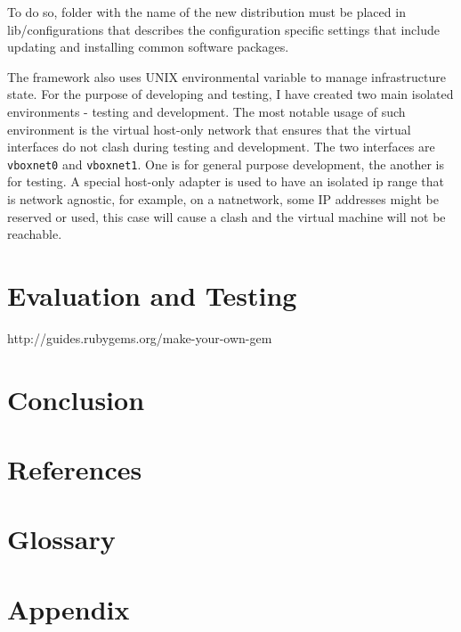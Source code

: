 \documentclass{article}
\begin{document}
To do so, folder with the name of the new distribution must be placed in lib/configurations that describes the configuration specific settings that include updating and installing common software packages.

The framework also uses UNIX environmental variable to manage infrastructure state. For the  purpose of developing and testing, I have created two main isolated environments - testing and development.
The most notable usage of such environment is the virtual host-only network that ensures that the virtual interfaces do not clash during testing and development. The two interfaces are \texttt{vboxnet0} and \texttt{vboxnet1}. One is for general purpose development, the another is for testing. A special host-only adapter is used to have an isolated ip range that is network agnostic, for example, on a \gls{natnetwork}, some IP addresses might be reserved or used, this case will cause a clash and the virtual machine will not be reachable.

\newpage
\section{Evaluation and Testing}
http://guides.rubygems.org/make-your-own-gem
\newpage
\section{Conclusion}

\newpage
\section{References}


\renewcommand{\bibname}{}

\newpage
\section{Glossary}
\printglossary
\newpage
\section{Appendix}
\end{document}
